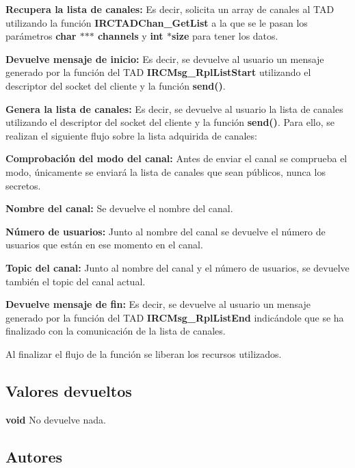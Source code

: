 \begin{DoxyItemize}
\item {\bfseries Recupera la lista de canales\+:} Es decir, solicita un array de canales al T\+AD utilizando la función {\bfseries I\+R\+C\+T\+A\+D\+Chan\+\_\+\+Get\+List} a la que se le pasan los parámetros {\bfseries char $\ast$$\ast$$\ast$ channels} y {\bfseries int $\ast$size} para tener los datos.  
\item {\bfseries Devuelve mensaje de inicio\+:} Es decir, se devuelve al usuario un mensaje generado por la función del T\+AD {\bfseries I\+R\+C\+Msg\+\_\+\+Rpl\+List\+Start} utilizando el descriptor del socket del cliente y la función {\bfseries send()}. 
\item {\bfseries Genera la lista de canales\+:} Es decir, se devuelve al usuario la lista de canales utilizando el descriptor del socket del cliente y la función {\bfseries send()}. Para ello, se realizan el siguiente flujo sobre la lista adquirida de canales\+: 
\begin{DoxyItemize}
\item {\bfseries Comprobación del modo del canal\+:} Antes de enviar el canal se comprueba el modo, únicamente se enviará la lista de canales que sean públicos, nunca los secretos. 
\item {\bfseries Nombre del canal\+:} Se devuelve el nombre del canal. 
\item {\bfseries Número de usuarios\+:} Junto al nombre del canal se devuelve el número de usuarios que están en ese momento en el canal. 
\item {\bfseries Topic del canal\+:} Junto al nombre del canal y el número de usuarios, se devuelve también el topic del canal actual. 
\end{DoxyItemize}
\item {\bfseries Devuelve mensaje de fin\+:} Es decir, se devuelve al usuario un mensaje generado por la función del T\+AD {\bfseries I\+R\+C\+Msg\+\_\+\+Rpl\+List\+End} indicándole que se ha finalizado con la comunicación de la lista de canales. 
\end{DoxyItemize}

Al finalizar el flujo de la función se liberan los recursos utilizados.\hypertarget{server_command_list_return_list}{}\subsection{Valores devueltos}\label{server_command_list_return_list}

\begin{DoxyItemize}
\item {\bfseries void} No devuelve nada. 
\end{DoxyItemize}\hypertarget{server_command_list_authors_list}{}\subsection{Autores}\label{server_command_list_authors_list}

